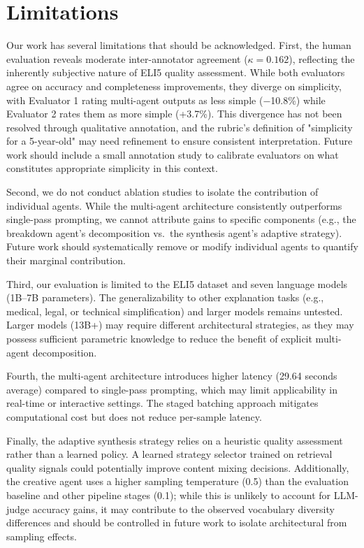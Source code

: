 \section{Limitations}

Our work has several limitations that should be acknowledged. First, the human evaluation reveals moderate inter-annotator agreement ($\kappa=0.162$), reflecting the inherently subjective nature of ELI5 quality assessment. While both evaluators agree on accuracy and completeness improvements, they diverge on simplicity, with Evaluator 1 rating multi-agent outputs as less simple ($-$10.8\%) while Evaluator 2 rates them as more simple (+3.7\%). This divergence has not been resolved through qualitative annotation, and the rubric's definition of "simplicity for a 5-year-old" may need refinement to ensure consistent interpretation. Future work should include a small annotation study to calibrate evaluators on what constitutes appropriate simplicity in this context.

Second, we do not conduct ablation studies to isolate the contribution of individual agents. While the multi-agent architecture consistently outperforms single-pass prompting, we cannot attribute gains to specific components (e.g., the breakdown agent's decomposition vs.\ the synthesis agent's adaptive strategy). Future work should systematically remove or modify individual agents to quantify their marginal contribution.

Third, our evaluation is limited to the ELI5 dataset and seven language models (1B--7B parameters). The generalizability to other explanation tasks (e.g., medical, legal, or technical simplification) and larger models remains untested. Larger models (13B+) may require different architectural strategies, as they may possess sufficient parametric knowledge to reduce the benefit of explicit multi-agent decomposition.

Fourth, the multi-agent architecture introduces higher latency (29.64 seconds average) compared to single-pass prompting, which may limit applicability in real-time or interactive settings. The staged batching approach mitigates computational cost but does not reduce per-sample latency.

Finally, the adaptive synthesis strategy relies on a heuristic quality assessment rather than a learned policy. A learned strategy selector trained on retrieval quality signals could potentially improve content mixing decisions. Additionally, the creative agent uses a higher sampling temperature (0.5) than the evaluation baseline and other pipeline stages (0.1); while this is unlikely to account for LLM-judge accuracy gains, it may contribute to the observed vocabulary diversity differences and should be controlled in future work to isolate architectural from sampling effects.

